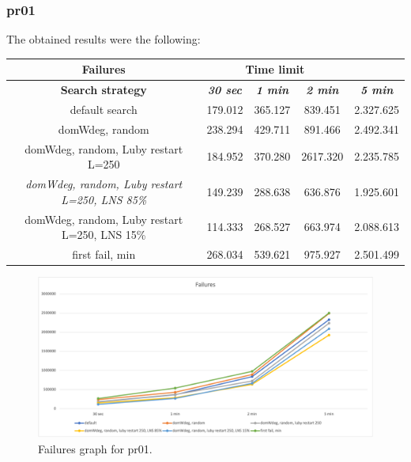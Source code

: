 \subsubsection{pr01}
The obtained results were the following:
{
\renewcommand{\arraystretch}{2}
\begin{longtable}[h]{| c | c | c | c | c |}
    \hline
    \textbf{Failures} & \multicolumn{3}{c}{Time limit} & \\
    \hline
    \textbf{Search strategy} & \textbf{\textit{30 sec}} & \textbf{\textit{1 min}} & \textbf{\textit{2 min}} & \textbf{\textit{5 min}} \\
    \hline
    \endhead
    default search                                         & 179.012 & 365.127 &  839.451 & 2.327.625 \\
    \hline
    domWdeg, random                                        & 238.294 & 429.711 &  891.466 & 2.492.341 \\
    \hline
    domWdeg, random, Luby restart L=250                    & 184.952 & 370.280 & 2617.320 & 2.235.785 \\
    \hline
    \textit{domWdeg, random, Luby restart L=250, LNS 85\%} & 149.239 & 288.638 &  636.876 & 1.925.601 \\
    \hline
    domWdeg, random, Luby restart L=250, LNS 15\%          & 114.333 & 268.527 &  663.974 & 2.088.613 \\
    \hline
    first fail, min                                        & 268.034 & 539.621 &  975.927 & 2.501.499 \\
    \hline
\end{longtable}
}
\begin{figure}[H]
    \centering
    \includegraphics[width=1.0\columnwidth]{../graphs/pr01-failures.png}
    \caption{Failures graph for pr01.}
\end{figure}

